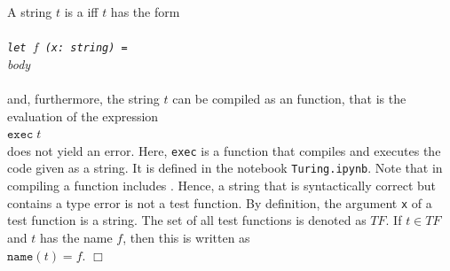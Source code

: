 \begin{Definition} 
A string $t$ is a  
iff $t$ has the form {\em\\[0.2cm]
\hspace*{1.3cm} \texttt{}         \\
\hspace*{1.3cm} \texttt{let $f$ (x: string) =} \\
\hspace*{1.8cm} \textsl{body}        \\
\hspace*{1.3cm} \texttt{}}         \\[0.2cm]
and, furthermore, the string $t$ can be compiled as an \Fsharp{} function, that is the evaluation of
the expression
\\[0.2cm]
\hspace*{1.3cm}
$\texttt{exec}\;t$
\\[0.2cm]
does not yield an error.  Here, \texttt{exec} is a function that compiles and executes the \Fsharp{} code
given as a string.  It is defined in the notebook \texttt{Turing.ipynb}.  Note that in \Fsharp{}
compiling a function includes .  Hence, a string that is syntactically correct but
contains a type error is not a test function.  By definition, the argument \texttt{x} of a test function is
a string.  
The set of all test functions is denoted as $T\!F$.  If $t \in T\!F$ and $t$ has the name $f$, then
this is written as 
\\[0.2cm]
\hspace*{1.3cm}
$\mathtt{name}(t) = f$. \hspace*{\fill} $\Box$
\end{Definition}

